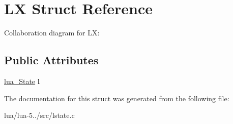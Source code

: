 \hypertarget{struct_l_x}{\section{L\+X Struct Reference}
\label{struct_l_x}
}


Collaboration diagram for L\+X\+:
\subsection*{Public Attributes}
\begin{DoxyCompactItemize}
\item 
\hypertarget{struct_l_x_ab3435adb3d01a4aa9b6096f818d86b4d}{\hyperlink{structlua___state}{lua\+\_\+\+State} {\bfseries l}}\label{struct_l_x_ab3435adb3d01a4aa9b6096f818d86b4d}

\end{DoxyCompactItemize}


The documentation for this struct was generated from the following file\+:\begin{DoxyCompactItemize}
\item 
lua/lua-\/5../src/lstate.\+c\end{DoxyCompactItemize}
